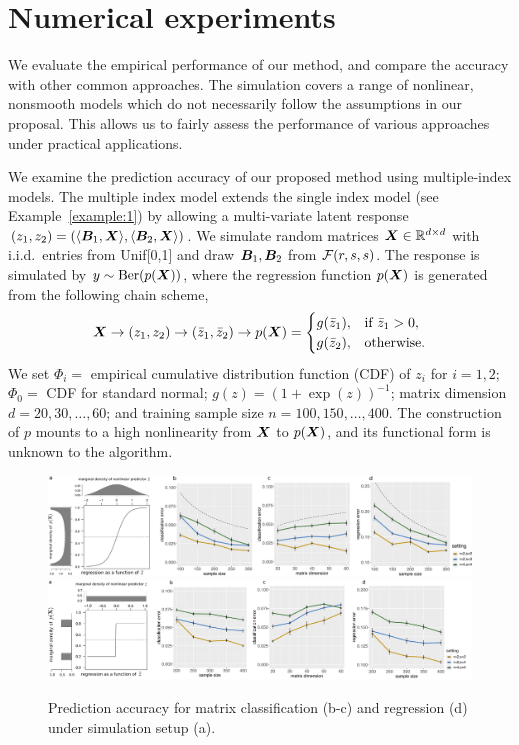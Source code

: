 \documentclass[11pt]{article}
\theoremstyle{definition}
\begin{document}
\section{Numerical experiments}\label{sec:data}
We evaluate the empirical performance of our method, and compare the accuracy with other common approaches. The simulation covers a range of nonlinear, nonsmooth models which do not necessarily follow the assumptions in our proposal. This allows us to fairly assess the performance of various approaches under practical applications. 

We examine the prediction accuracy of our proposed method using multiple-index models. The multiple index model extends the single index model (see Example~\ref{example:1}) by allowing a multi-variate latent response $(z_1,z_2)=\left(\langle \bm B_1, \bm X \rangle,\langle \bm B_2, \bm X \rangle\right)$. We simulate random matrices $\bm X\in\mathbb{R}^{d\times d}$ with i.i.d.\ entries from Unif[0,1] and draw $\bm B_1, \bm B_2$ from $\mathcal{F}(r,s,s)$. The response is simulated by $y\sim \text{Ber}(p(\bm X))$, where the regression function $p(\bm X)$ is generated from the following chain scheme,
\begin{equation}
\bm X \to (z_1,z_2) \to 
(\bar z_1, \bar z_2)
\to p(\bm X)=
\begin{cases}
g(\bar z_1), & \text{if }\bar z_1>0,\\
g(\bar z_2), & \text{otherwise}. 
\end{cases}
\end{equation}
We set $\Phi_i = $ empirical cumulative distribution function (CDF) of $z_i$ for $i=1,2$; $\Phi_0 = $ CDF for standard normal; $g(z)=(1+\exp(z))^{-1}$; matrix dimension $d=20,30,\ldots,60$; and training sample size $n=100, 150, \ldots, 400$. The construction of $p$ mounts to a high nonlinearity from $\bm X$ to $p(\bm X)$, and its functional form is unknown to the algorithm. 

\begin{figure}[H]
\centering
\includegraphics[width=.9\textwidth]{combined.pdf}
\includegraphics[width=.9\textwidth]{combined_steps.pdf}
\caption{Prediction accuracy for matrix classification (b-c) and regression (d) under simulation setup (a). }\label{fig:logistic}
\vspace{-.5cm}
\end{figure}
\end{document}
